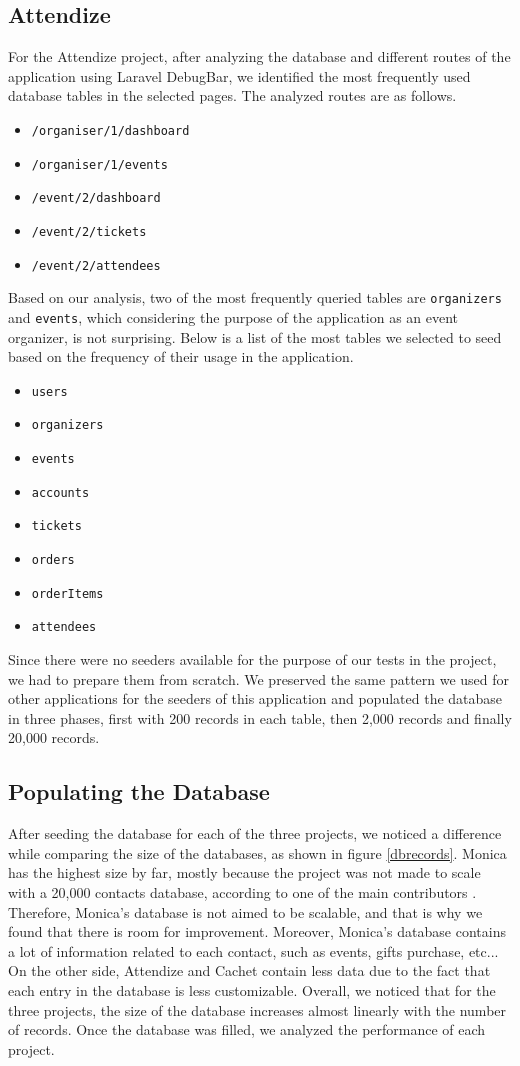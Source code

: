\documentclass[sigconf]{acmart}
\begin{document}
\subsection{Attendize}
For the Attendize project, after analyzing the database and different routes of the application using Laravel DebugBar, we identified the most frequently used database tables in the selected pages. The analyzed routes are as follows.
\begin{itemize}
\item \texttt{/organiser/1/dashboard}
\item \texttt{/organiser/1/events}
\item \texttt{/event/2/dashboard}
\item \texttt{/event/2/tickets}
\item \texttt{/event/2/attendees}
\end{itemize}
Based on our analysis, two of the most frequently queried tables are \texttt{organizers} and \texttt{events}, which considering the purpose of the application as an event organizer, is not surprising. Below is a list of the most tables we selected to seed based on the frequency of their usage in the application.
\begin{itemize}
\item \texttt{users}
\item \texttt{organizers}
\item \texttt{events}
\item \texttt{accounts}
\item \texttt{tickets}
\item \texttt{orders}
\item \texttt{orderItems}
\item \texttt{attendees}
\end{itemize}
Since there were no seeders available for the purpose of our tests in the project, we had to prepare them from scratch. We preserved the same pattern we used for other applications for the seeders of this application and populated the database in three phases, first with 200 records in each table, then 2,000 records and finally 20,000 records.

\subsection{Populating the Database}
After seeding the database for each of the three projects, we noticed a difference while comparing the size of the databases, as shown in figure \ref{dbrecords}. Monica has the highest size by far, mostly because the project was not made to scale with a 20,000 contacts database, according to one of the main contributors \cite{MonicaPagination}. Therefore, Monica's database is not aimed to be scalable, and that is why we found that there is room for improvement. Moreover, Monica's database contains a lot of information related to each contact, such as events, gifts purchase, etc... On the other side, Attendize and Cachet contain less data due to the fact that each entry in the database is less customizable. Overall, we noticed that for the three projects, the size of the database increases almost linearly with the number of records. Once the database was filled, we analyzed the performance of each project.
\end{document}

